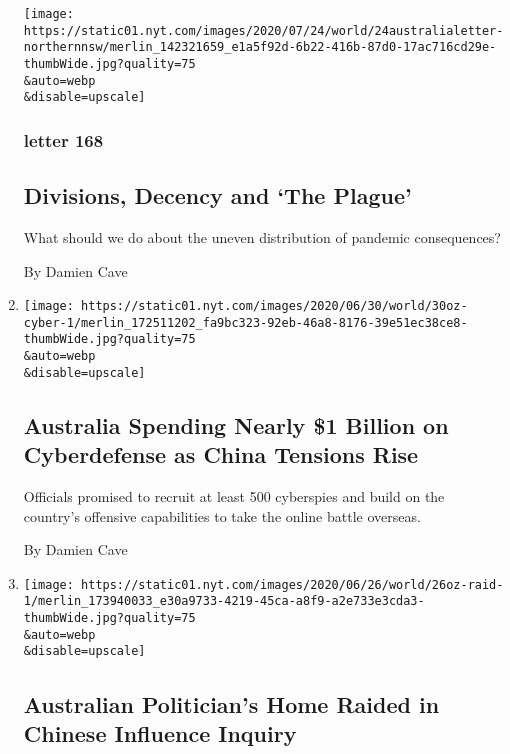 \begin{enumerate}
  \texttt{[image: https://static01.nyt.com/images/2020/07/24/world/24australialetter-northernnsw/merlin\_142321659\_e1a5f92d-6b22-416b-87d0-17ac716cd29e-thumbWide.jpg?quality=75\\\&auto=webp\\\&disable=upscale]}

  \hypertarget{letter-168}{%
  \subsubsection{letter 168}\label{letter-168}}

  \hypertarget{divisions-decency-and-the-plague}{%
  \subsection{Divisions, Decency and `The
  Plague'}\label{divisions-decency-and-the-plague}}

  What should we do about the uneven distribution of pandemic
  consequences?

  By Damien Cave
\item
  \href{/2020/06/30/world/australia/cyber-defense-china-hacking.html}{}

  \texttt{[image: https://static01.nyt.com/images/2020/06/30/world/30oz-cyber-1/merlin\_172511202\_fa9bc323-92eb-46a8-8176-39e51ec38ce8-thumbWide.jpg?quality=75\\\&auto=webp\\\&disable=upscale]}

  \hypertarget{australia-spending-nearly-1-billion-on-cyberdefense-as-china-tensions-rise}{%
  \subsection{Australia Spending Nearly \$1 Billion on Cyberdefense as
  China Tensions
  Rise}\label{australia-spending-nearly-1-billion-on-cyberdefense-as-china-tensions-rise}}

  Officials promised to recruit at least 500 cyberspies and build on the
  country's offensive capabilities to take the online battle overseas.

  By Damien Cave
\item
  \href{/2020/06/26/world/australia/politician-home-raid-china-influence.html}{}

  \texttt{[image: https://static01.nyt.com/images/2020/06/26/world/26oz-raid-1/merlin\_173940033\_e30a9733-4219-45ca-a8f9-a2e733e3cda3-thumbWide.jpg?quality=75\\\&auto=webp\\\&disable=upscale]}

  \hypertarget{australian-politicians-home-raided-in-chinese-influence-inquiry}{%
  \subsection{Australian Politician's Home Raided in Chinese Influence
  Inquiry}\label{australian-politicians-home-raided-in-chinese-influence-inquiry}}


\end{enumerate}
